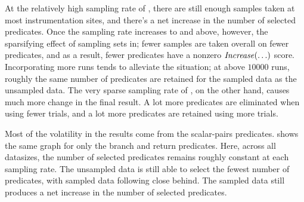 At the relatively high sampling rate of
, there are still enough samples taken at most
instrumentation sites, and there's a net increase in the number of
selected predicates.  Once the sampling rate increases to
 and above, however, the sparsifying effect of
sampling sets in; fewer samples are taken overall on fewer predicates,
and as a result, fewer predicates have a nonzero $\mbox{\textit{Increase}}(\ldots)$ score.
Incorporating more runs tends to alleviate the situation; at above
$10000$ runs, roughly the same number of predicates are retained for
the  sampled data as the unsampled data.  The very
sparse sampling rate of , on the other hand,
causes much more change in the final result.  A lot more predicates
are eliminated when using fewer trials, and a lot more predicates are
retained using more trials.

Most of the volatility in the results come from the scalar-pairs
predicates.   shows the same graph for
only the branch and return predicates.  Here, across all datasizes,
the number of selected predicates remains roughly constant at each
sampling rate.  The unsampled data is still able to select the fewest
number of predicates, with  sampled data following
close behind.  The  sampled data still produces a
net increase in the number of selected predicates.


